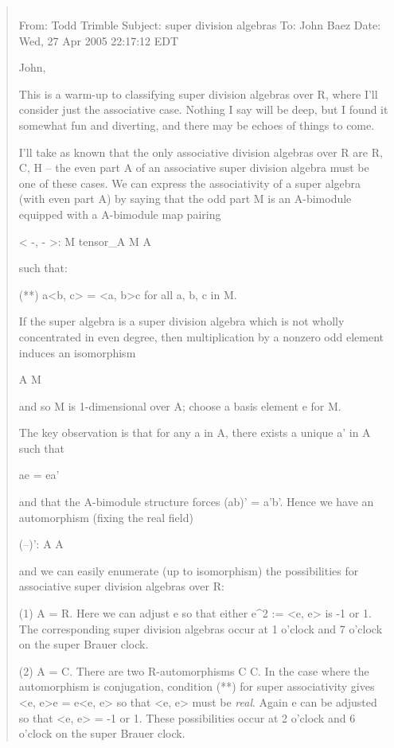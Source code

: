 \begin{quote}

$$

From: Todd Trimble
Subject: super division algebras 
To: John Baez
Date: Wed, 27 Apr 2005 22:17:12 EDT 

John, 
 
This is a warm-up to classifying super division algebras 
over R, where I'll consider just the associative case.  
Nothing I say will be deep, but I found it somewhat fun 
and diverting, and there may be echoes of things to come. 
 
I'll take as known that the only associative division algebras 
over R are R, C, H  -- the even part A of an associative super 
division algebra must be one of these cases.  We can 
express the associativity of a super algebra (with even part 
A) by saying that the odd part M is an A-bimodule equipped 
with a A-bimodule map pairing 
 
     < -, - >:  M tensor_A M \to  A
 
such that:

(**)  a<b, c> = <a, b>c  for all a, b, c in M.  
 
If the super algebra is a super division algebra which is not 
wholly concentrated in even degree, then multiplication by a 
nonzero odd element induces an isomorphism 
 
                    A \to  M
 
and so M is 1-dimensional over A; choose a basis element e 
for M. 
 
The key observation is that for any a in A, there exists a 
unique a' in A such that 
 
                   ae = ea'  
 
and that the A-bimodule structure forces  (ab)' = a'b'.  Hence we 
have an automorphism (fixing the real field) 
 
              (--)': A \to  A
 
and we can easily enumerate (up to isomorphism) the possibilities 
for associative super division algebras over R: 
 
(1)  A = R.  Here we can adjust e so that either  e^{2} := <e, e>  is 
-1 or 1.  The corresponding super division algebras occur at 1 o'clock 
and 7 o'clock on the super Brauer clock. 
 
(2)  A = C.  There are two R-automorphisms  C \to  C.  In the case 
where the automorphism is conjugation, condition (**) for super 
associativity gives  <e, e>e = e<e, e>  so that  <e, e>  must be 
\emph{real}.  Again e can be adjusted so that  <e, e> = -1 or 1.  These 
possibilities occur at 2 o'clock and 6 o'clock on the super Brauer 
clock. 
 

\end{quote}
